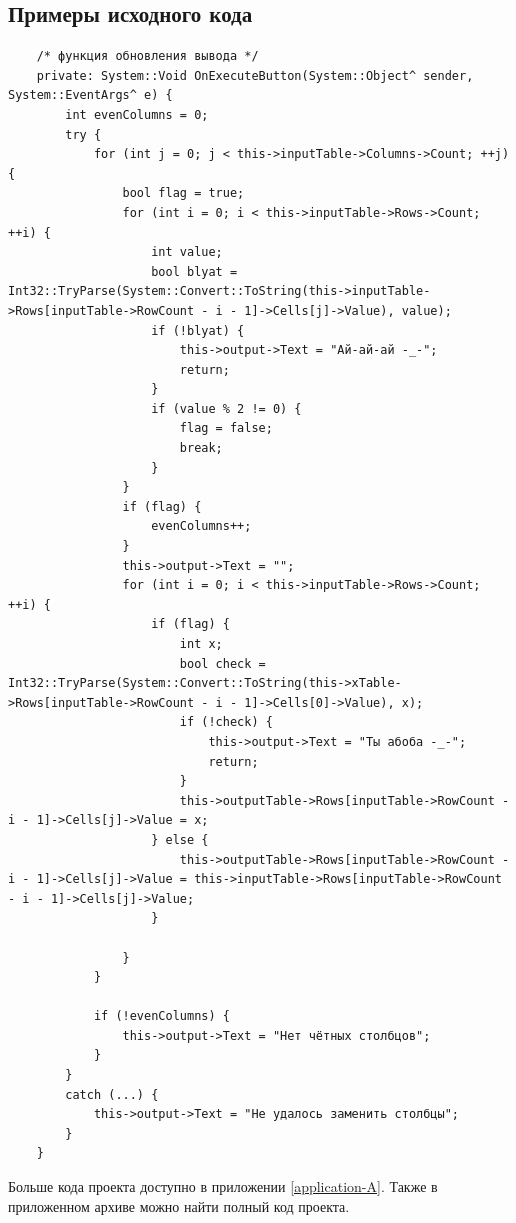 \subsection{Примеры исходного кода}
\begin{verbatim}
	/* функция обновления вывода */
	private: System::Void OnExecuteButton(System::Object^ sender, System::EventArgs^ e) {
		int evenColumns = 0;
		try {
			for (int j = 0; j < this->inputTable->Columns->Count; ++j) {
				bool flag = true;
				for (int i = 0; i < this->inputTable->Rows->Count; ++i) {
					int value;
					bool blyat = Int32::TryParse(System::Convert::ToString(this->inputTable->Rows[inputTable->RowCount - i - 1]->Cells[j]->Value), value);
					if (!blyat) {
						this->output->Text = "Ай-ай-ай -_-";
						return;
					}
					if (value % 2 != 0) {
						flag = false;
						break;
					}
				}
				if (flag) {
					evenColumns++;
				}
				this->output->Text = "";
				for (int i = 0; i < this->inputTable->Rows->Count; ++i) {
					if (flag) {
						int x;
						bool check = Int32::TryParse(System::Convert::ToString(this->xTable->Rows[inputTable->RowCount - i - 1]->Cells[0]->Value), x);
						if (!check) {
							this->output->Text = "Ты абоба -_-";
							return;
						}
						this->outputTable->Rows[inputTable->RowCount - i - 1]->Cells[j]->Value = x;
					} else {
						this->outputTable->Rows[inputTable->RowCount - i - 1]->Cells[j]->Value = this->inputTable->Rows[inputTable->RowCount - i - 1]->Cells[j]->Value;
					}
	
				}
			}

			if (!evenColumns) {
				this->output->Text = "Нет чётных столбцов";
			}
		}
		catch (...) {
			this->output->Text = "Не удалось заменить столбцы";
		}
	}
\end{verbatim}

Больше кода проекта доступно в приложении \ref{application-A}. Также в приложенном архиве можно найти полный код проекта.